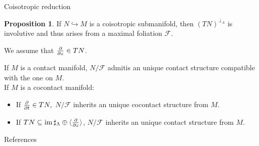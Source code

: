\documentclass{beamer}
\theoremstyle{definition}
\newtheorem{proposition}[theorem]{Proposition}
\begin{document}
\begin{frame}{Coisotropic reduction}
\begin{proposition}
If $N \hookrightarrow M$ is a \alert<1>{coisotropic} submanifold, then $(TN)^{\perp_\Lambda}$ is involutive and thus arises from a maximal foliation $\mathcal{F}$.
\end{proposition}
We assume that $\pdv{z} \in TN$. \pause
\begin{theorem}
If $M$ is a \alert<2>{contact} manifold, $N/ \mathcal{F}$ admitis an unique \alert<2>{contact} structure compatible with the one on $M$. \\
\pause
If $M$ is a \alert<3>{cocontact} manifold:\pause
\begin{itemize}
\item If $\pdv{t} \in TN,$ $N/\mathcal{F}$ inherits an unique \alert<4>{cocontact} structure from $M$. \pause
\item If $TN \subseteq \operatorname{im} \sharp_\Lambda \oplus \langle \pdv{z} \rangle$, $N/ \mathcal{F}$ inherits an unique \alert<5>{contact} structure from $M$.
\end{itemize}
\end{theorem}
\end{frame}
\begin{frame}{References}
    
    
\end{frame}
\end{document}
